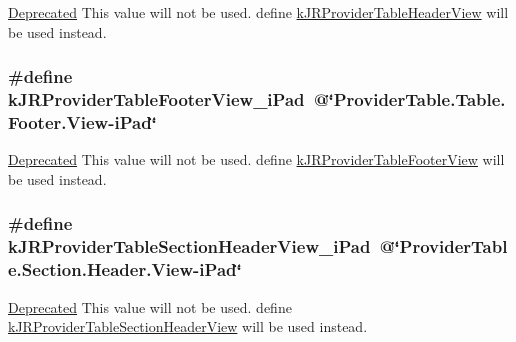 \label{group__custom_interface_gafaf90a1aa537b105ebc2409ceacc652f}
\begin{Desc}
\item[\hyperlink{deprecated__deprecated000014}{Deprecated}]This value will not be used. define \hyperlink{group__custom_interface_ga1a0f39bfdb880fdd0b8b39cbec492b6f}{kJRProviderTableHeaderView} will be used instead. \end{Desc}
\hypertarget{group__custom_interface_gaa23a63165d46433e2ec24ba44ef771da}{
\subsubsection[{kJRProviderTableFooterView\_\-iPad}]{\setlength{\rightskip}{0pt plus 5cm}\#define kJRProviderTableFooterView\_\-iPad~@\char`\"{}ProviderTable.Table.Footer.View-\/iPad\char`\"{}}}
\label{group__custom_interface_gaa23a63165d46433e2ec24ba44ef771da}
\begin{Desc}
\item[\hyperlink{deprecated__deprecated000015}{Deprecated}]This value will not be used. define \hyperlink{group__custom_interface_ga2b5c9162dd7701a552147ae1607a3b4d}{kJRProviderTableFooterView} will be used instead. \end{Desc}
\hypertarget{group__custom_interface_ga7dcb3488390fabe1f3a358fb5af1e42c}{
\subsubsection[{kJRProviderTableSectionHeaderView\_\-iPad}]{\setlength{\rightskip}{0pt plus 5cm}\#define kJRProviderTableSectionHeaderView\_\-iPad~@\char`\"{}ProviderTable.Section.Header.View-\/iPad\char`\"{}}}
\label{group__custom_interface_ga7dcb3488390fabe1f3a358fb5af1e42c}
\begin{Desc}
\item[\hyperlink{deprecated__deprecated000016}{Deprecated}]This value will not be used. define \hyperlink{group__custom_interface_gaaff8ebdd2b9badb1d0a019a71d47db46}{kJRProviderTableSectionHeaderView} will be used instead. \end{Desc}
